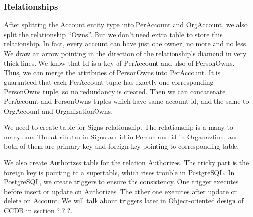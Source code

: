 \documentclass[11pt]{article}
\begin{document}
\subsubsection{Relationships}
\par
After splitting the Account entity type into PerAccount and OrgAccount, we also split the relationship ``Owns''. But we don't need extra table to store this relationship. In fact, every account can have just one owner, no more and no less. We draw an arrow pointing in the direction of the relationship's diamond in very thick lines. We know that Id is a key of PerAccount and also of PersonOwns. Thus, we can merge the attributes of PersonOwns into PerAccount. It is guaranteed that each PerAccount tuple has exactly one corresponding PersonOwns tuple, so no redundancy is created. Then we can concatenate PerAccount and PersonOwns tuples which have same account id, and the same to OrgAccount and OrganizationOwns.
\par
We need to create table for Signs relationship. The relationship is a many-to-many one. The attributes in Signs are id in Person and id in Organaztion, and both of them are primary key and foreign key pointing to corresponding table.
\par
We also create Authorizes table for the relation Authorizes. The tricky part is the foreign key is pointing to a supertable, which rises trouble in PostgreSQL. In PostgreSQL, we create triggers to ensure the consistency. One trigger executes before insert or update on Authorizes. The other one executes after update or delete on Account. We will talk about triggers later in Object-oriented design of CCDB in section ?.?.?.
\end{document}
